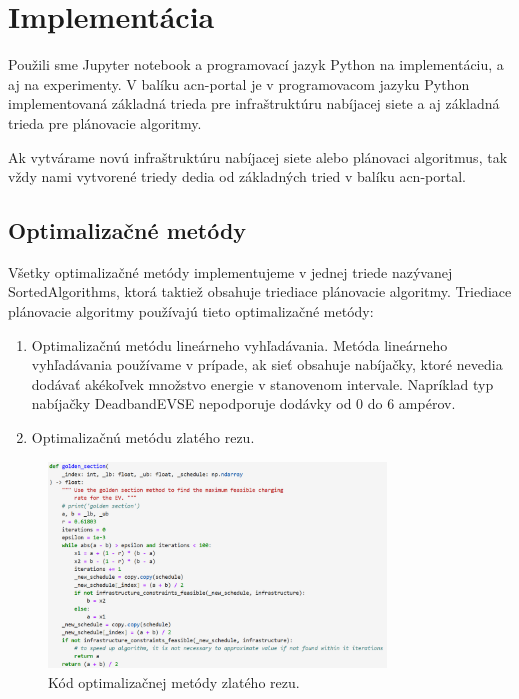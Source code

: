 \chapter{Implementácia}

Použili sme Jupyter notebook a programovací jazyk Python na implementáciu, a aj na experimenty. V balíku acn-portal je v programovacom jazyku Python implementovaná základná trieda pre infraštruktúru nabíjacej siete a aj základná trieda pre plánovacie algoritmy.

Ak vytvárame novú infraštruktúru nabíjacej siete alebo plánovaci algoritmus, tak vždy nami vytvorené triedy dedia od základných tried v balíku acn-portal.

\section{Optimalizačné metódy}
Všetky optimalizačné metódy implementujeme v jednej triede nazývanej SortedAlgorithms, ktorá taktiež obsahuje triediace plánovacie algoritmy. Triediace plánovacie algoritmy používajú tieto optimalizačné metódy:

\begin{enumerate}
    \item Optimalizačnú metódu lineárneho vyhľadávania. Metóda lineárneho vyhľadávania používame v prípade, ak sieť obsahuje nabíjačky, ktoré nevedia dodávať akékoľvek množstvo energie v stanovenom intervale. Napríklad typ nabíjačky DeadbandEVSE nepodporuje dodávky od 0 do 6 ampérov. \cite{lee2021acnsim}
    \item  Optimalizačnú metódu zlatého rezu.
\end{enumerate}


\begin{figure}[H]
    \includegraphics[width=0.8\textwidth]{images/golden_section_code.png}
    \centering
    \caption[Kód optimalizačnej metódy zlatého rezu]{Kód optimalizačnej metódy zlatého rezu.}
    \label{acndata:obr}
    \end{figure}







